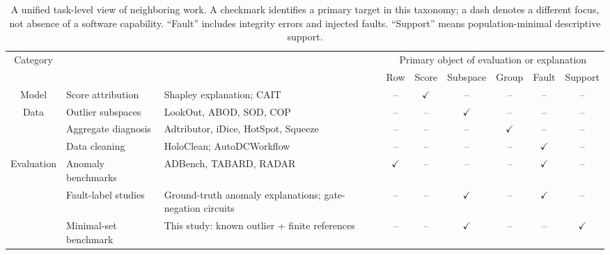 \documentclass[conference]{IEEEtran}
\begin{document}
\begin{table}[t]
\centering\scriptsize
\caption{A unified task-level view of neighboring work. A checkmark identifies a primary target in this taxonomy; a dash denotes a different focus, not absence of a software capability. ``Fault'' includes integrity errors and injected faults. ``Support'' means population-minimal descriptive support.}
\setlength{\tabcolsep}{3.3pt}
\renewcommand{\arraystretch}{1.27}
\begin{tabularx}{\textwidth}{|c|>{\raggedright\arraybackslash}p{1.75cm}|>{\raggedright\arraybackslash}X|c|c|c|c|c|c|}
\hline
\multirow{2}{*}{Category} & \multirow{2}{*}{Task / idea} & \multirow{2}{*}{Representative work} & \multicolumn{6}{c|}{Primary object of evaluation or explanation} \\
\cline{4-9}
 & & & Row & Score & Subspace & Group & Fault & Support \\
\hline
Model & Score attribution & Shapley explanation; CAIT~\cite{kluttermann2024shapley,mok2025cait} & -- & $\checkmark$ & -- & -- & -- & -- \\
\hline
\multirow{3}{*}{Data} & Outlier subspaces & LookOut, ABOD, SOD, COP~\cite{gupta2018lookout,kriegel2008abod,kriegel2009sod,kriegel2012cop} & -- & -- & $\checkmark$ & -- & -- & -- \\
\cline{2-9}
 & Aggregate diagnosis & Adtributor, iDice, HotSpot, Squeeze~\cite{bhagwan2014adtributor,lin2016idice,sun2018hotspot,li2019squeeze} & -- & -- & -- & $\checkmark$ & -- & -- \\
\cline{2-9}
 & Data cleaning & HoloClean; AutoDCWorkflow~\cite{rekatsinas2017holoclean,li2025autodcworkflow} & -- & -- & -- & -- & $\checkmark$ & -- \\
\hline
\multirow{3}{*}{Evaluation} & Anomaly benchmarks & ADBench, TABARD, RADAR~\cite{han2022adbench,choudhury2025tabard,gu2025radar} & $\checkmark$ & -- & -- & -- & $\checkmark$ & -- \\
\cline{2-9}
 & Fault-label studies & Ground-truth anomaly explanations; gate-negation circuits~\cite{antwarg2024groundtruth,myrtakis2021comparative} & -- & -- & $\checkmark$ & -- & $\checkmark$ & -- \\
\cline{2-9}
 & Minimal-set benchmark & This study: known outlier + finite references & -- & -- & $\checkmark$ & -- & -- & $\checkmark$ \\
\hline
\end{tabularx}
\renewcommand{\arraystretch}{1.0}
\label{tab:related-work}
\end{table}
\end{document}
